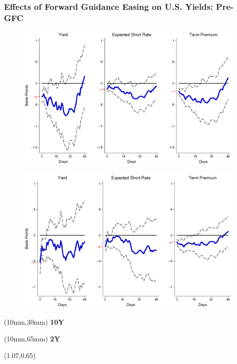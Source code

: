 \documentclass[12pt, aspectratio=169, xcolor=dvipsnames]{beamer}
\begin{document}
\begin{frame}[label=FGUSpre]
\frametitle{Effects of Forward Guidance Easing on U.S. Yields: Pre-GFC}
\begin{figure}[!htbp]
	\begin{center} %
		\includegraphics[trim={0cm 0cm 0cm 0cm},clip,height=0.45\textheight,width=0.85\linewidth]{../Figures/LPs/LagDep-FX/Path/US/PathUSDnomyptp120mPre.eps}
		\par\end{center}
\end{figure}
\vspace{-0.5cm}
\begin{figure}[!htbp]
	\begin{center} %
		\includegraphics[trim={0cm 0cm 0cm 0.76cm},clip,height=0.45\textheight,width=0.85\linewidth]{../Figures/LPs/LagDep-FX/Path/US/PathUSDnomyptp24mPre.eps}
		\par\end{center}
\end{figure}
\begin{textblock*}{8mm}(10mm,30mm)
	\small \textbf{10Y}
\end{textblock*}
\begin{textblock*}{8mm}(10mm,65mm)
	\small \textbf{2Y}
\end{textblock*}
\begin{textblock*}{5cm}(1.07\textwidth,0.65\textheight)
	\hyperlink{FGEMpre}{}
\end{textblock*}
\end{frame}
\end{document}
